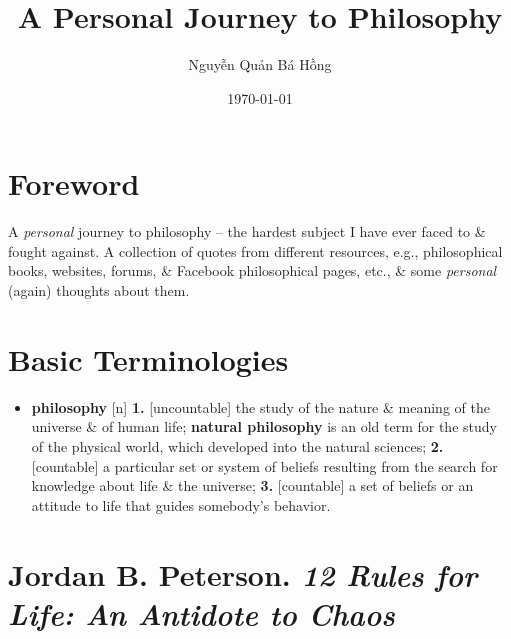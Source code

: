 \documentclass[oneside]{book}
\title{A Personal Journey to Philosophy}
\author{Nguyễn Quản Bá Hồng}
\date{\today}
\numberwithin{equation}{section}
\begin{document}
\maketitle
{}
\tableofcontents


\chapter*{Foreword}

A \textit{personal} journey to philosophy -- the hardest subject I have ever faced to \& fought against. A collection of quotes from different resources, e.g., philosophical books, websites, forums, \& Facebook philosophical pages, etc., \& some \textit{personal} (again) thoughts about them.


\chapter*{Basic Terminologies}
\begin{itemize}
	\item \textbf{philosophy} [n] \textbf{1.} [uncountable] the study of the nature \& meaning of the universe \& of human life; \textbf{natural philosophy} is an old term for the study of the physical world, which developed into the natural sciences; \textbf{2.} [countable] a particular set or system of beliefs resulting from the search for knowledge about life \& the universe; \textbf{3.} [countable] a set of beliefs or an attitude to life that guides somebody's behavior.
\end{itemize}


\chapter{Jordan B. Peterson. \textit{12 Rules for Life: An Antidote to Chaos}}
\end{document}
